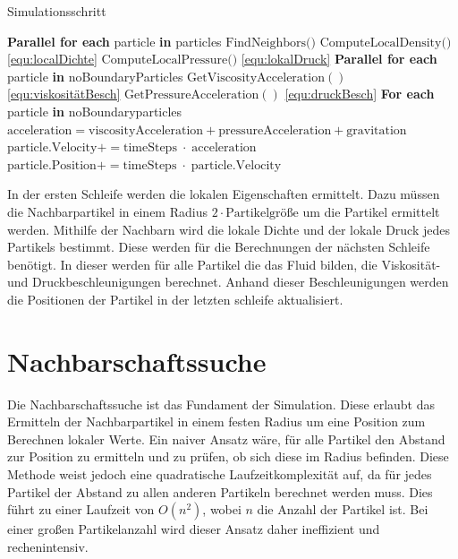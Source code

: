 \documentclass[a4paper, 12pt]{article}
\begin{document}
\begin{algorithm}[H]
	\caption{Simulationsschritt}
	\begin{algorithmic}[1]
	\State \textbf{Parallel for each} particle \textbf{in} particles
	\State \quad $\text{FindNeighbors()}$
	\State \quad $\text{ComputeLocalDensity()}$ \hfill \eqref{equ:localDichte}
	\State \quad $\text{ComputeLocalPressure()}$ \hfill \eqref{equ:lokalDruck}
	\vspace{1em}
	\State \textbf{Parallel for each} particle \textbf{in} noBoundaryParticles
	\State \quad $\text{GetViscosityAcceleration}()$ \hfill \eqref{equ:viskositätBesch}
	\State \quad $\text{GetPressureAcceleration}()$ \hfill \eqref{equ:druckBesch}
	\vspace{1em}
	\State \textbf{For each} particle \textbf{in} noBoundaryparticles
	\State \quad $\text{acceleration} = \text{viscosityAcceleration} + \text{pressureAcceleration} + \text{gravitation}$
	\State \quad $\text{particle.Velocity} += \text{timeSteps}\;\cdot\;\text{acceleration}$
	\State \quad $\text{particle.Position} += \text{timeSteps}\;\cdot\;\text{particle.Velocity}$
	\end{algorithmic}
	\end{algorithm}

In der ersten Schleife werden die lokalen Eigenschaften ermittelt. Dazu müssen die Nachbarpartikel in einem Radius $2 \cdot \text{Partikelgröße}$ um die Partikel ermittelt werden. Mithilfe der Nachbarn wird die lokale Dichte und der lokale Druck jedes Partikels bestimmt. Diese werden für die Berechnungen der nächsten Schleife benötigt. In dieser werden für alle Partikel die das Fluid bilden, die Viskosität- und Druckbeschleunigungen berechnet. Anhand dieser Beschleunigungen werden die Positionen der Partikel in der letzten schleife aktualisiert. 
 
\section{Nachbarschaftssuche} \label{Kap:NachbarschaftsSuche}
Die Nachbarschaftssuche ist das Fundament der Simulation. Diese erlaubt das Ermitteln der Nachbarpartikel in einem festen Radius um eine Position zum Berechnen lokaler Werte. Ein naiver Ansatz wäre, für alle Partikel den Abstand zur Position zu ermitteln und zu prüfen, ob sich diese im Radius befinden. Diese Methode weist jedoch eine quadratische Laufzeitkomplexität auf, da für jedes Partikel der Abstand zu allen anderen Partikeln berechnet werden muss. Dies führt zu einer Laufzeit von $O(n^2)$, wobei $n$ die Anzahl der Partikel ist. Bei einer großen Partikelanzahl wird dieser Ansatz daher ineffizient und rechenintensiv.
\end{document}
